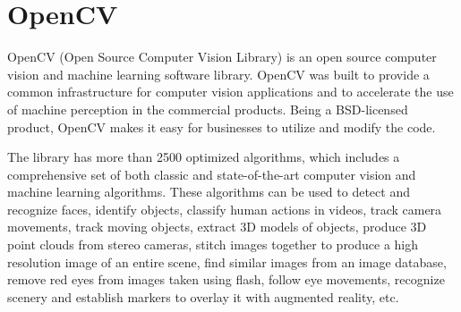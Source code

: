 \section{OpenCV} %
\label{sec:opencv}
OpenCV (Open Source Computer Vision Library) is an open source computer vision and machine learning software library. OpenCV was built to provide a common infrastructure for computer vision applications and to accelerate the use of machine perception in the commercial products. Being a BSD-licensed product, OpenCV makes it easy for businesses to utilize and modify the code.
\par\bigskip
The library has more than 2500 optimized algorithms, which includes a comprehensive set of both classic and state-of-the-art computer vision and machine learning algorithms. These algorithms can be used to detect and recognize faces, identify objects, classify human actions in videos, track camera movements, track moving objects, extract 3D models of objects, produce 3D point clouds from stereo cameras, stitch images together to produce a high resolution image of an entire scene, find similar images from an image database, remove red eyes from images taken using flash, follow eye movements, recognize scenery and establish markers to overlay it with augmented reality, etc.





